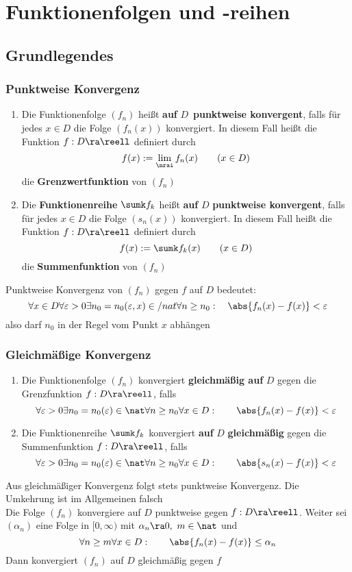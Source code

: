 \documentclass{kit}
\begin{document}
\section{Funktionenfolgen und -reihen}
  \subsection{Grundlegendes}
    \subsubsection{Punktweise Konvergenz}
      \begin{enumerate}
        \item Die Funktionenfolge $(f_n)$ heißt \textbf{auf} $D$ \textbf{punktweise konvergent}, falls für jedes $x\in D$ die Folge $(f_n(x))$ konvergiert. In diesem Fall heißt die Funktion $f:D\ra\reell$ definiert durch
          $$f(x):=\lim_\nrai f_n(x)\qquad(x\in D)$$
          die \textbf{Grenzwertfunktion} von $(f_n)$
        \item Die \textbf{Funktionenreihe} $\sumk f_k$ heißt \textbf{auf} $D$ \textbf{punktweise konvergent}, falls für jedes $x\in D$ die Folge $(s_n(x))$ konvergiert. In diesem Fall heißt die Funktion $f:D\ra\reell$ definiert durch
          $$f(x):=\sumk f_k(x)\qquad(x\in D)$$
          die \textbf{Summenfunktion} von $(f_n)$
      \end{enumerate}
      Punktweise Konvergenz von $(f_n)$ gegen $f$ auf $D$ bedeutet:
      $$\forall x\in D\forall\varepsilon>0\exists n_0=n_0(\varepsilon,x)\in/nat\forall n\ge n_0:\quad\abs{f_n(x)-f(x)}<\varepsilon$$
      also darf $n_0$ in der Regel vom Punkt $x$ abhängen
    \subsubsection{Gleichmäßige Konvergenz}
      \begin{enumerate}
        \item Die Funktionenfolge $(f_n)$ konvergiert \textbf{gleichmäßig auf} $D$ gegen die Grenzfunktion $f:D\ra\reell$, falls
          $$\forall\varepsilon>0\exists n_0=n_0(\varepsilon)\in\nat\forall n\ge n_0\forall x\in D:\qquad\abs{f_n(x)-f(x)}<\varepsilon$$
        \item Die Funktionenreihe $\sumk f_k$ konvergiert \textbf{auf} $D$ \textbf{gleichmäßig} gegen die Summenfunktion $f:D\ra\reell$, falls
          $$\forall\varepsilon>0\exists n_0=n_0(\varepsilon)\in\nat\forall n\ge n_0\forall x\in D:\qquad\abs{s_n(x)-f(x)}<\varepsilon$$
      \end{enumerate}
      Aus gleichmäßiger Konvergenz folgt stets punktweise Konvergenz. Die Umkehrung ist im Allgemeinen falsch\\
      Die Folge $(f_n)$ konvergiere auf $D$ punktweise gegen $f:D\ra\reell$. Weiter sei $(\alpha_n)$ eine Folge in $[0,\infty)$ mit $\alpha_n\ra0,\ m\in\nat$ und
      $$\forall n\ge m\forall x\in D:\qquad\abs{f_n(x)-f(x)}\le\alpha_n$$
      Dann konvergiert $(f_n)$ auf $D$ gleichmäßig gegen $f$
\end{document}
